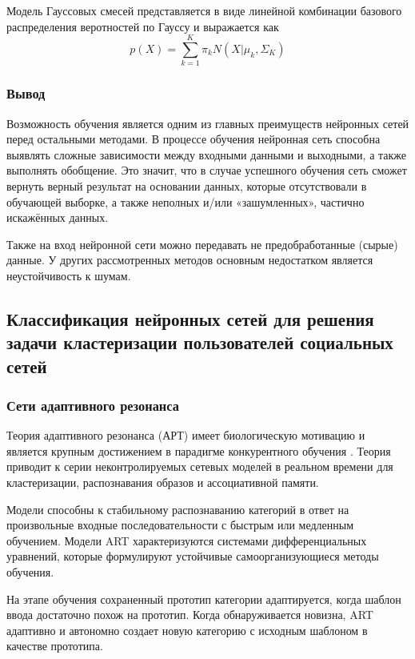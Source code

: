 Модель Гауссовых смесей представляется в виде линейной комбинации базового распределения веротностей по Гауссу и выражается как
\begin{equation}
	p(X) = \sum_{k=1}^{K}\pi_kN(X|\mu_k, \Sigma_K)
\end{equation}

\subsubsection{Вывод}
Возможность обучения является одним из главных преимуществ нейронных сетей перед остальными методами. В процессе обучения нейронная сеть способна выявлять сложные зависимости между входными данными и выходными, а также выполнять обобщение. Это значит, что в случае успешного обучения сеть сможет вернуть верный результат на основании данных, которые отсутствовали в обучающей выборке, а также неполных и/или «зашумленных», частично искажённых данных.

Также на вход нейронной сети можно передавать не предобработанные (сырые) данные. У других рассмотренных методов основным недостатком является неустойчивость к шумам.

\subsection{Классификация нейронных сетей для решения задачи кластеризации пользователей социальных сетей}

\subsubsection{Сети адаптивного резонанса}
Теория адаптивного резонанса (АРТ) имеет биологическую мотивацию и является крупным достижением в парадигме конкурентного обучения \cite{du2010clustering}. Теория приводит к серии неконтролируемых сетевых моделей в реальном времени для кластеризации, распознавания образов и ассоциативной памяти.

Модели способны к стабильному распознаванию категорий в ответ на произвольные входные последовательности с быстрым или медленным обучением. Модели ART характеризуются системами дифференциальных уравнений, которые формулируют устойчивые самоорганизующиеся методы обучения. 

На этапе обучения сохраненный прототип категории адаптируется, когда шаблон ввода достаточно похож на прототип. Когда обнаруживается новизна, ART адаптивно и автономно создает новую категорию с исходным шаблоном в качестве прототипа.

